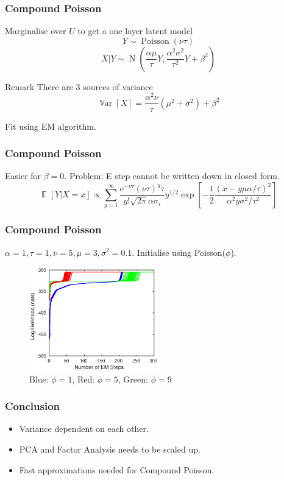 \documentclass{beamer}
\DeclareMathOperator{\expectation}{\mathbb{E}}
\DeclareMathOperator{\variance}{\mathbb{V}ar}
\DeclareMathOperator{\normal}{N}
\DeclareMathOperator{\poisson}{Poisson}
\newcommand{\euler}{\mathrm{e}}
\begin{document}
\begin{frame}
\frametitle{Compound Poisson}
Marginalise over $U$ to get a one layer latent model
\begin{equation}
Y\sim\poisson(\nu\tau)
\end{equation}
\begin{equation}
X|Y\sim\normal\left(
\frac{\alpha\mu}{\tau}Y,\frac{\alpha^2\sigma^2}{\tau^2}Y+\beta^2
\right)
\end{equation}
\begin{block}{Remark}
There are 3 sources of variance
\begin{equation}
\variance[X] = \frac{\alpha^2\nu}{\tau}\left(\mu^2+\sigma^2\right)+\beta^2
\end{equation}
\end{block}
Fit using EM algorithm.
\end{frame}

\begin{frame}
\frametitle{Compound Poisson}
Easier for $\beta=0$. Problem: E step cannot be written down in closed form.
\begin{equation}
\expectation\left[Y|X=x\right]\propto
\sum_{y=1}^{\infty}\dfrac{\euler^{-\nu\tau}(\nu\tau)^{y}\tau}{y!\sqrt{2\pi}\alpha\sigma_i}y^{1/2}
\exp\left[-\dfrac{1}{2}\dfrac{\left(x-y\mu\alpha/\tau\right)^2}{\alpha^2y\sigma^2/\tau^2}\right]
\end{equation}
\end{frame}

\begin{frame}
\frametitle{Compound Poisson}
$\alpha=1,\tau=1,\nu=5,\mu=3,\sigma^2=0.1.$ Initialise using Poisson($\phi$).
\begin{figure}
	\includegraphics[width=0.5\textwidth]{figures/hierarchicalModel/EM_initial_lnL.eps}
	\caption{Blue: $\phi=1$, Red: $\phi=5$, Green: $\phi=9$}
\end{figure}
\end{frame}

\begin{frame}
\frametitle{Conclusion}
\begin{itemize}
	\item Variance dependent on each other.
	\item PCA and Factor Analysis needs to be scaled up.
	\item Fast approximations needed for Compound Poisson.
\end{itemize}
\end{frame}
\end{document}
